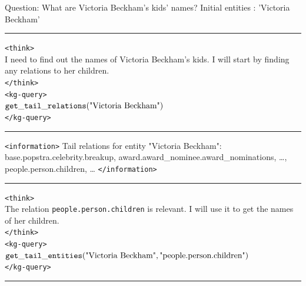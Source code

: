 \begin{table}[H]
\centering
\caption{Example \framework{} response on , showing multi-step reasoning and verification for a person-children query. \textcolor{blue}{Blue} denotes responses generated by the \framework{} agent.}
\begin{reasonbox}[title=\framework{} Response Example — \dataset{WebQSP}]
Question: What are Victoria Beckham's kids' names?
Initial entities : 'Victoria Beckham'
\vspace{0.5em}\hrule\vspace{0.5em}

\begin{blueblock}
\texttt{<think>}\\
I need to find out the names of Victoria Beckham's kids. I will start by finding any relations to her children.\\
\texttt{</think>}\\
\texttt{<kg-query>}\\
$\mathtt{get\_tail\_relations}(\text{"Victoria Beckham"})$\\
\texttt{</kg-query>}
\end{blueblock}

\vspace{0.5em}\hrule\vspace{0.5em}

\texttt{<information>} Tail relations for entity "Victoria Beckham":\\
base.popstra.celebrity.breakup, award.award\_nominee.award\_nominations, \dots, people.person.children, \dots
\texttt{</information>}

\vspace{0.5em}\hrule\vspace{0.5em}

\begin{blueblock}
\texttt{<think>}\\
The relation \texttt{people.person.children} is relevant. I will use it to get the names of her children.\\
\texttt{</think>}\\
\texttt{<kg-query>}\\
$\mathtt{get\_tail\_entities}(\text{"Victoria Beckham"}, \text{"people.person.children"})$\\
\texttt{</kg-query>}
\end{blueblock}

\vspace{0.5em}\hrule\vspace{0.5em}


\end{reasonbox}
\end{table}
